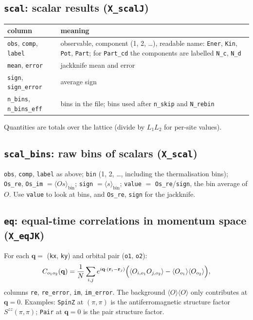 \documentclass[11pt,a4paper]{article}
\newcommand{\f}[1]{\texttt{#1}}
\begin{document}
\subsection{\texttt{scal}: scalar results (\texttt{X\_scalJ})}
\begin{center}\small
\begin{tabularx}{\textwidth}{lX}
\toprule
column & meaning \\
\midrule
\f{obs}, \f{comp}, \f{label} & observable, component (1, 2, \dots), readable name: \f{Ener}, \f{Kin}, \f{Pot}, \f{Part}; for \f{Part\_cd} the components are labelled \f{N\_c}, \f{N\_d} \\
\f{mean}, \f{error} & jackknife mean and error \\
\f{sign}, \f{sign\_error} & average sign \\
\f{n\_bins}, \f{n\_bins\_eff} & bins in the file; bins used after \f{n\_skip} and \f{N\_rebin} \\
\bottomrule
\end{tabularx}\end{center}
Quantities are totals over the lattice (divide by $L_1L_2$ for per-site values).

\subsection{\texttt{scal\_bins}: raw bins of scalars (\texttt{X\_scal})}
\f{obs}, \f{comp}, \f{label} as above; \f{bin} (1, 2, \dots, including the thermalisation
bins); \f{Os\_re}, \f{Os\_im} $=\langle O s\rangle_\text{bin}$; \f{sign} $=\langle s\rangle_\text{bin}$;
\f{value} $=$ \f{Os\_re}/\f{sign}, the bin average of $O$. Use \f{value} to look at bins, and
\f{Os\_re}, \f{sign} for the jackknife.

\subsection{\texttt{eq}: equal-time correlations in momentum space (\texttt{X\_eqJK})}
For each $\mathbf q=$ (\f{kx}, \f{ky}) and orbital pair (\f{o1}, \f{o2}):
\begin{equation}
  C_{o_1o_2}(\mathbf q)=\frac1N\sum_{i,j}e^{i\mathbf q\cdot(\mathbf r_i-\mathbf r_j)}
  \Bigl(\langle O_{i,o_1}O_{j,o_2}\rangle-\langle O_{o_1}\rangle\langle O_{o_2}\rangle\Bigr),
\end{equation}
columns \f{re}, \f{re\_error}, \f{im}, \f{im\_error}. The background
$\langle O\rangle\langle O\rangle$ only contributes at $\mathbf q=0$. Examples: \f{SpinZ} at
$(\pi,\pi)$ is the antiferromagnetic structure factor $S^{zz}(\pi,\pi)$; \f{Pair} at $\mathbf
q=0$ is the pair structure factor.
\end{document}
